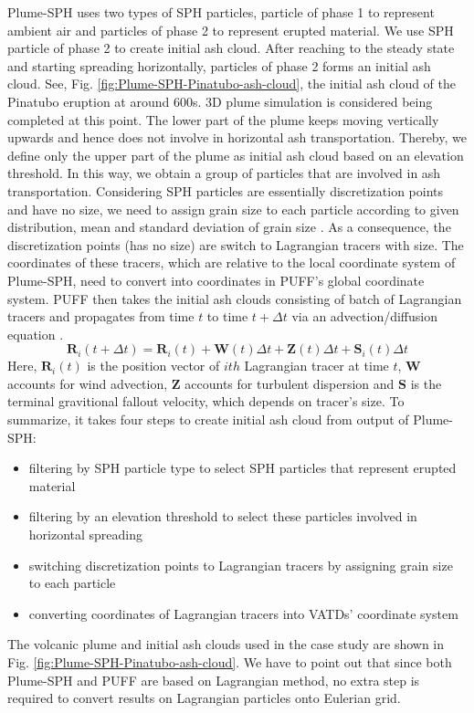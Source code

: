 Plume-SPH uses two types of SPH particles, particle of phase 1 to represent ambient air and particles of phase 2 to represent erupted material. We use SPH particle of phase 2 to create initial ash cloud. After reaching to the steady state and starting spreading horizontally, particles of phase 2 forms an initial ash cloud. See, Fig. \ref{fig:Plume-SPH-Pinatubo-ash-cloud}, the initial ash cloud of the Pinatubo eruption at around 600s. 3D plume simulation is considered being completed at this point. The lower part of the plume keeps moving vertically upwards and hence does not involve in horizontal ash transportation. Thereby, we define only the upper part of the plume as initial ash cloud based on an elevation threshold. In this way, we obtain a group of particles that are involved in ash transportation. Considering SPH particles are essentially discretization points and have no size, we need to assign grain size to each particle according to given distribution, mean and standard deviation of grain size \citep{paladio1996tephra}. As a consequence, the discretization points (has no size) are switch to Lagrangian tracers with size. The coordinates of these tracers, which are relative to the local coordinate system of Plume-SPH, need to convert into coordinates in PUFF's global coordinate system. PUFF then takes the initial ash clouds consisting of batch of Lagrangian tracers and propagates from time $t$ to time $t+\Delta t$ via an advection/diffusion equation \citep{searcy1998puff}.
\begin{equation}
\textbf{R}_i(t+\Delta t) = \textbf{R}_i(t) + \textbf{W}(t)\Delta t + \textbf{Z}(t)\Delta t +  \textbf{S}_i(t) \Delta t
\end{equation}
Here, $\textbf{R}_i(t)$ is the position vector of $ith$ Lagrangian tracer at time $t$, $\textbf{W}$ accounts for wind advection, $\textbf{Z}$ accounts for turbulent dispersion and $\textbf{S}$ is the terminal gravitional fallout velocity, which depends on tracer's size.
To summarize, it takes four steps to create initial ash cloud from output of Plume-SPH:
\begin{itemize}
\item filtering by SPH particle type to select SPH particles that represent erupted material
\item filtering by an elevation threshold to select these particles involved in horizontal spreading 
\item switching discretization points to Lagrangian tracers by assigning grain size to each particle
\item converting coordinates of Lagrangian tracers into VATDs' coordinate system
\end{itemize}
The volcanic plume and initial ash clouds used in the case study are shown in Fig. \ref{fig:Plume-SPH-Pinatubo-ash-cloud}. We have to point out that since both Plume-SPH and PUFF are based on Lagrangian method, no extra step is required to convert results on Lagrangian particles onto Eulerian grid.

